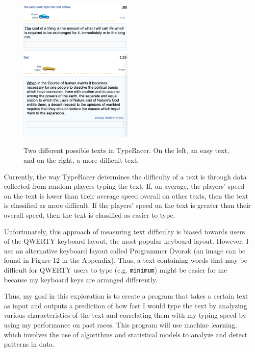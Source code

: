 \documentclass[12pt]{article}
\begin{document}
\begin{figure}[H]
	\caption{Two different possible texts in TypeRacer. On the left, an easy text, and on the right, a more difficult text.}
	\includegraphics[width=0.5\textwidth]{easy-text.png}
	\includegraphics[width=0.5\textwidth]{hard-text.png}
\end{figure}

Currently, the way TypeRacer determines the difficulty of a text is through data collected from random players typing the text. If, on average, the players' speed on the text is lower than their average speed overall on other texts, then the text is classified as more difficult. If the players' speed on the text is greater than their overall speed, then the text is classified as easier to type.

Unfortunately, this approach of measuring text difficulty is biased towards users of the QWERTY keyboard layout, the most popular keyboard layout. However, I use an alternative keyboard layout called Programmer Dvorak (an image can be found in Figure 12 in the Appendix). Thus, a text containing words that may be difficult for QWERTY users to type (e.g. \texttt{minimum}) might be easier for me because my keyboard keys are arranged differently.

Thus, my goal in this exploration is to create a program that takes a certain text as input and outputs a prediction of how fast I would type the text by analyzing various characteristics of the text and correlating them with my typing speed by using my performance on past races. This program will use machine learning, which involves the use of algorithms and statistical models to analyze and detect patterns in data.
\end{document}

